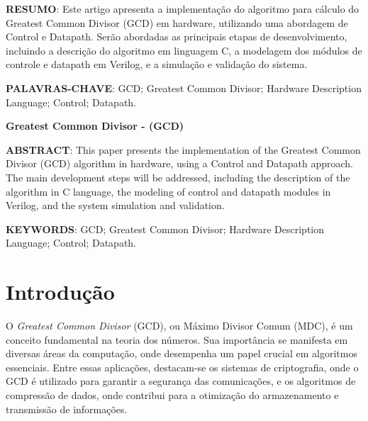 \documentclass[a4paper,11pt]{article} %
\begin{document}


\begin{center}
    \tableofcontents %
\end{center}

\newpage


\vspace{0.5cm}
\noindent\textbf{RESUMO}: 
Este artigo apresenta a implementação do algoritmo para cálculo do 
Greatest Common Divisor (GCD) em hardware, 
utilizando uma abordagem de Control e Datapath. 
Serão abordadas as principais etapas de desenvolvimento, 
incluindo a descrição do algoritmo em linguagem C, 
a modelagem dos módulos de controle e datapath em Verilog, 
e a simulação e validação do sistema.

\vspace{0.5cm}
\noindent\textbf{PALAVRAS-CHAVE}: 
GCD; Greatest Common Divisor; Hardware Description Language; Control; Datapath.

\vspace{0.5cm}
 \begin{center}
 \textbf{Greatest Common Divisor - (GCD)}
 \end{center}

\noindent\textbf{ABSTRACT}: 
This paper presents the implementation of the Greatest Common Divisor (GCD) 
algorithm in hardware, using a Control and Datapath approach. 
The main development steps will be addressed, 
including the description of the algorithm in C language, 
the modeling of control and datapath modules in Verilog, 
and the system simulation and validation.

\vspace{0.5cm}
\noindent\textbf{KEYWORDS}: GCD; Greatest Common Divisor; Hardware Description Language; Control; Datapath.

\section{Introdução}

O \textit{Greatest Common Divisor} (GCD), ou Máximo Divisor Comum (MDC), é um conceito fundamental na teoria dos números. Sua importância se manifesta em diversas áreas da computação, onde desempenha um papel crucial em algoritmos essenciais. Entre essas aplicações, destacam-se os sistemas de criptografia, onde o GCD é utilizado para garantir a segurança das comunicações, e os algoritmos de compressão de dados, onde contribui para a otimização do armazenamento e transmissão de informações.
\end{document}
